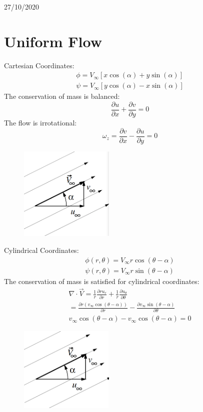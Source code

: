 \documentclass[class=report, crop=false, 12pt,a4paper]{standalone}
\begin{document}
\begin{center}
    27/10/2020
\end{center}
\section{Uniform Flow}
Cartesian Coordinates:
\begin{gather}
  \phi = V_{\infty} \left[ x\cos(\alpha) + y\sin(\alpha) \right]\\
  \psi = V_{\infty} \left[ y\cos(\alpha) - x\sin(\alpha) \right]
\end{gather}
The conservation of mass is balanced:
\begin{equation}
  \frac{\partial u}{\partial x} + \frac{\partial v}{\partial y} = 0
\end{equation}
The flow is irrotational:
\begin{equation}
  \omega_z = \frac{\partial v}{\partial x} - \frac{\partial u}{\partial y} = 0
\end{equation}
\begin{figure}[H]
  \centering
  \includegraphics[width = 0.4\textwidth]{../img/diagram16.png}
\end{figure}
Cylindrical Coordinates:
\begin{gather}
  \phi (r, \theta) = V_{\infty} r \cos(\theta - \alpha)\\
  \psi (r, \theta) = V_{\infty} r \sin(\theta - \alpha)
\end{gather}
The conservation of mass is satisfied for cylindrical coordinates:
\begin{gather}
  \nabla \cdot \overrightarrow{V} = \frac{1}{r}\frac{\partial ru_r}{\partial r} + \frac{1}{r}\frac{\partial u_{\theta}}{\partial \theta} \\
  = \frac{\partial r(v_{\infty}\cos(\theta-\alpha))}{\partial r} - \frac{\partial v_{\infty}\sin(\theta-\alpha)}{\partial \theta} \\
  v_{\infty}\cos(\theta-\alpha) - v_{\infty}\cos(\theta-\alpha) = 0
\end{gather}
\begin{figure}[H]
  \centering
  \includegraphics[width = 0.4\textwidth]{../img/diagram17.png}
\end{figure}
\end{document}
